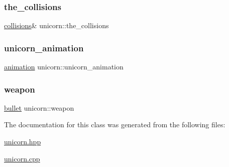 \mbox{\label{classunicorn_a77b6bd58d4bd308c55a530c50fdcce41}} 
\subsubsection{\texorpdfstring{the\+\_\+collisions}{the\_collisions}}
{\footnotesize\ttfamily \hyperlink{drawable_8hpp_a7e1a7f34f6d09dabb4cdafd6e4118603}{collisions}\& unicorn\+::the\+\_\+collisions\hspace{0.3cm}{\ttfamily [private]}}

\mbox{\label{classunicorn_a0d6df4ae413adcf9307c2f36e9c1d51b}} 
\subsubsection{\texorpdfstring{unicorn\+\_\+animation}{unicorn\_animation}}
{\footnotesize\ttfamily \hyperlink{classanimation}{animation} unicorn\+::unicorn\+\_\+animation\hspace{0.3cm}{\ttfamily [private]}}

\mbox{\label{classunicorn_a3e51a9e196533b27304f21eb26d8f4ba}} 
\subsubsection{\texorpdfstring{weapon}{weapon}}
{\footnotesize\ttfamily \hyperlink{classbullet}{bullet} unicorn\+::weapon\hspace{0.3cm}{\ttfamily [private]}}



The documentation for this class was generated from the following files\+:\begin{DoxyCompactItemize}
\item 
\hyperlink{unicorn_8hpp}{unicorn.\+hpp}\item 
\hyperlink{unicorn_8cpp}{unicorn.\+cpp}\end{DoxyCompactItemize}
